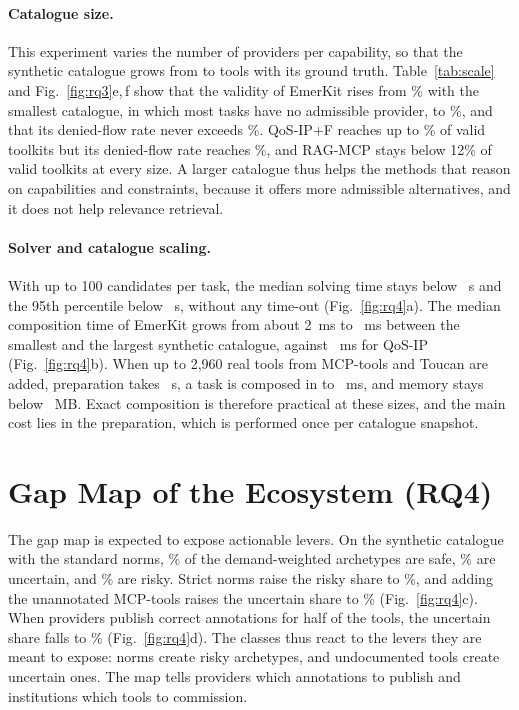 \documentclass[10pt]{article}
\newcommand{\sysname}{EmerKit}
\begin{document}
\paragraph{Catalogue size.} This experiment varies the number of providers per capability, so that the synthetic catalogue grows from \RXoneMin{} to \RXoneMax{} tools with its ground truth. Table~\ref{tab:scale} and Fig.~\ref{fig:rq3}e,\,f show that the validity of \sysname{} rises from \RXoneEmkValidMin\% with the smallest catalogue, in which most tasks have no admissible provider, to \RXoneEmkValidMax\%, and that its denied-flow rate never exceeds \RXoneEmkDfrMax\%. QoS-IP+F reaches up to \RXoneZfValidMax\% of valid toolkits but its denied-flow rate reaches \RXoneZfDfrMax\%, and RAG-MCP stays below 12\% of valid toolkits at every size. A larger catalogue thus helps the methods that reason on capabilities and constraints, because it offers more admissible alternatives, and it does not help relevance retrieval.

\paragraph{Solver and catalogue scaling.} With up to 100 candidates per task, the median solving time stays below \RCthreeMedMax{}~s and the 95th percentile below \RCthreePmax{}~s, without any time-out (Fig.~\ref{fig:rq4}a). The median composition time of \sysname{} grows from about 2~ms to \RXoneEmkMs{}~ms between the smallest and the largest synthetic catalogue, against \RXoneZMs{}~ms for QoS-IP (Fig.~\ref{fig:rq4}b). When up to 2{,}960 real tools from MCP-tools and Toucan are added, preparation takes \RCfourPrep{}~s, a task is composed in \RCfourEmkSmall{} to \RCfourEmkLarge{}~ms, and memory stays below \RCfourMem{}~MB. Exact composition is therefore practical at these sizes, and the main cost lies in the preparation, which is performed once per catalogue snapshot.

\section{Gap Map of the Ecosystem (RQ4)}\label{sec:res-h4}

The gap map is expected to expose actionable levers. On the synthetic catalogue with the standard norms, \REoneSafeSyn\% of the demand-weighted archetypes are safe, \REoneUncSyn\% are uncertain, and \REoneRiskStd\% are risky. Strict norms raise the risky share to \REoneRiskStrict\%, and adding the unannotated MCP-tools raises the uncertain share to \REoneUncMix\% (Fig.~\ref{fig:rq4}c). When providers publish correct annotations for half of the tools, the uncertain share falls to \REtwoUncHalf\% (Fig.~\ref{fig:rq4}d). The classes thus react to the levers they are meant to expose: norms create risky archetypes, and undocumented tools create uncertain ones. The map tells providers which annotations to publish and institutions which tools to commission.
\end{document}
